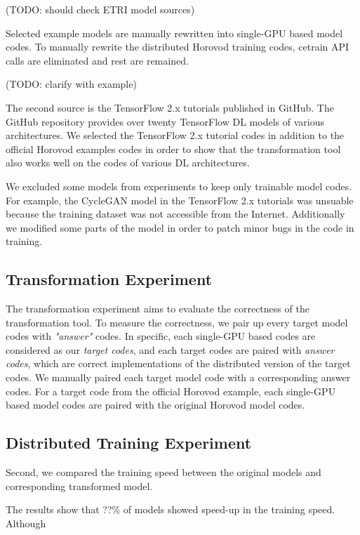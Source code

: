 (TODO: should check ETRI model sources)

Selected example models are manually rewritten into
single-GPU based model codes. To manually rewrite the distributed Horovod
training codes, cetrain API calls are eliminated and rest are remained.   

(TODO: clarify with example)

The second source is the TensorFlow 2.x tutorials published in
GitHub\cite{tf2tutogithub}. The GitHub repository provides over twenty
TensorFlow DL models of various architectures. 
We selected the TensorFlow 2.x tutorial codes in addition to the official
Horovod examples codes in order to show that the transformation tool
also works well on the codes of various DL architectures.

We excluded some models from experiments to keep only trainable model codes. 
For example, the CycleGAN model in the TensorFlow 2.x tutorials
was unsuable because the training dataset was not accessible from the
Internet. Additionally we modified some parts of the model in order to patch
minor bugs in the code in training.

\subsection{Transformation Experiment}

The transformation experiment aims to evaluate the correctness of the
transformation tool. To measure the correctness, we pair up every
target model codes with \textit{"answer"} codes. In specific,      
each single-GPU based codes are considered as our \textit{target codes},
and each target codes are paired with \textit{answer codes}, which are
correct implementations of the distributed version of the target codes. 
We manually paired each target model code with a corresponding answer codes.
For a target code from the official Horovod example, each single-GPU based
model codes are paired with the original Horovod model codes.     


\subsection{Distributed Training Experiment}

Second, we compared the training speed between the original models and
corresponding transformed model. 

The results show that ??\% of models showed speed-up in the training speed.
Although  

